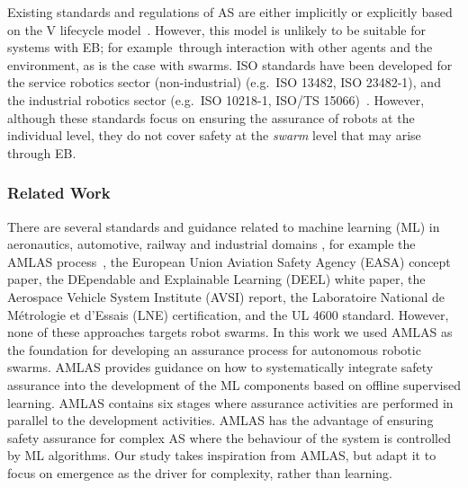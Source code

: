 \documentclass[runningheads]{llncs}
\begin{document}
Existing standards and regulations of AS are either implicitly or explicitly based on the V lifecycle model~\cite{Jia2021}. %
However, this model is unlikely to be suitable for systems with EB; for example\ through interaction with other agents and the environment, as is the case with swarms. 
ISO standards have been developed for the service robotics sector (non-industrial) (e.g.\ ISO 13482, ISO 23482-1), and the industrial robotics sector (e.g.\ ISO 10218-1, ISO/TS 15066)~\cite{Abeywickrama2022}. 
However, although these standards focus on ensuring the assurance of robots at the individual level, they do not cover safety at the \emph{swarm} level that may arise through EB. 
%
\subsubsection{Related Work} There are several standards and guidance related to machine learning (ML) in aeronautics, automotive, railway and industrial domains \cite{Kaakai2022}, for example the AMLAS process~\cite{Hawkins2021}, the European Union Aviation Safety Agency (EASA) concept paper, the DEpendable and Explainable Learning (DEEL) white paper, the Aerospace Vehicle System Institute (AVSI) report, the Laboratoire National de Métrologie et d'Essais (LNE) certification, and the UL 4600 standard. However, none of these approaches targets robot swarms. 
In this work we used AMLAS \cite{Hawkins2021} as the foundation for developing an assurance process for autonomous robotic swarms. 
AMLAS provides guidance on how to systematically integrate safety assurance into the development of the ML components based on offline supervised learning. 
AMLAS contains six stages where assurance activities are performed in parallel to the development activities. 
AMLAS has the advantage of ensuring safety assurance for complex AS where the behaviour of the system is controlled by ML algorithms. 
Our study takes inspiration from AMLAS, but adapt it to focus on emergence as the driver for complexity, rather than learning. 
\vspace{-2ex}
\end{document}
